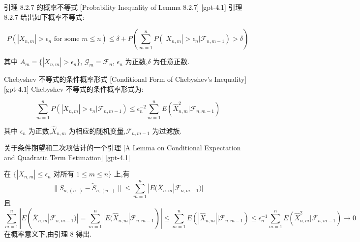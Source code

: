 \documentclass[UTF8]{ctexart}
\begin{document}
    
    
    \begin{lma}
        {引理 8.2.7 的概率不等式}
        [Probability Inequality of Lemma 8.2.7]
        [gpt-4.1]
        引理 8.2.7 给出如下概率不等式:

\[
P ( | X_{n,m} | > \epsilon_n \text{ for some } m \leq n ) \leq \delta + P \left( \sum_{m=1}^n P ( | X_{n,m} | > \epsilon_n | \mathcal{F}_{n,m-1} ) > \delta \right)
\]

其中 $A_m = \{ | X_{n,m} | > \epsilon_n \}$, $\mathcal{G}_m = \mathcal{F}_n$, $\epsilon_n$ 为正数,$\delta$ 为任意正数.

    \end{lma}
    
    
    
    \begin{ppt}
        {Chebyshev 不等式的条件概率形式}
        [Conditional Form of Chebyshev's Inequality]
        [gpt-4.1]
        Chebyshev 不等式的条件概率形式为:

\[
\sum_{m=1}^n P ( | X_{n,m} | > \epsilon_n | \mathcal{F}_{n,m-1} ) \leq \epsilon_n^{-2} \sum_{m=1}^n E ( \hat{X}_{n,m}^2 | \mathcal{F}_{n,m-1} )
\]

其中 $\epsilon_n$ 为正数,$\hat{X}_{n,m}$ 为相应的随机变量,$\mathcal{F}_{n,m-1}$ 为过滤族.

    \end{ppt}
    
    
    
    \begin{lma}
        {关于条件期望和二次项估计的一个引理}
        [A Lemma on Conditional Expectation and Quadratic Term Estimation]
        [gpt-4.1]
        
在 $\{ | X _ { n , m } | \leq \epsilon _ { n }$ 对所有 $1 \leq m \leq n \}$ 上,有
\[
\| S _ { n , ( n \cdot ) } - \tilde { S } _ { n , ( n \cdot ) } \| \leq \sum _ { m = 1 } ^ { n } | E ( \bar { X } _ { n , m } | \mathcal { F } _ { n , m - 1 } ) |
\]
且
\[
\sum _ { m = 1 } ^ { n } | E ( \bar { X } _ { n , m } | \mathcal { F } _ { n , m - 1 } ) | 
= \sum _ { m = 1 } ^ { n } | E ( \hat { X } _ { n , m } | \mathcal { F } _ { n , m - 1 } ) |
\leq \sum _ { m = 1 } ^ { n } E ( | \hat { X } _ { n , m } | | \mathcal { F } _ { n , m - 1 } )
\leq \epsilon _ { n } ^ { - 1 } \sum _ { m = 1 } ^ { n } E ( \hat { X } _ { n , m } ^ { 2 } | \mathcal { F } _ { n , m - 1 } ) \to 0
\]
在概率意义下,由引理 8 得出.

    \end{lma}
    
\end{document}
